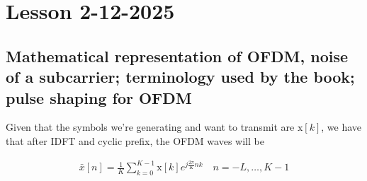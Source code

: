 \documentclass[a4paper, 12pt]{book}
\begin{document}
\setcounter{chapter}{7}
\chapter{Lesson 2-12-2025}
\section[Mathematical representation of OFDM]{Mathematical representation of OFDM, noise of a subcarrier; terminology used by the book; pulse shaping for OFDM}

Given that the symbols we're generating and want to transmit are $\mathrm{x}[k]$, we have that after IDFT and cyclic prefix, the OFDM waves will be

\begin{align}
    \bar{x}[n] = \frac{1}{K} \sum_{k=0}^{K-1} \mathrm{x}[k] e^{j \frac{2\pi}{K} nk} \quad n = -L, \dots, K-1 \tag{2.211}
\end{align}
\end{document}
